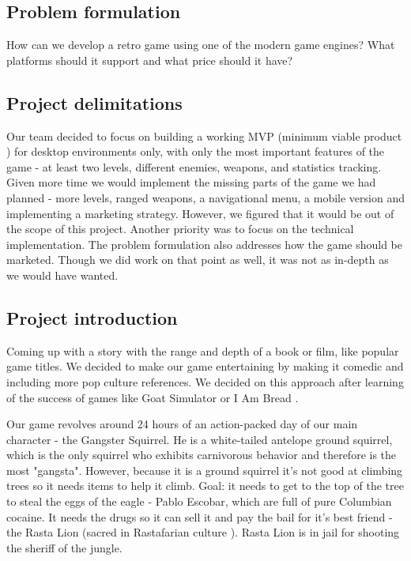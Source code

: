 \documentclass[12p]{article}
\begin{document}
\subsection{Problem formulation} \label{ProblemFormulation}

How can we develop a retro game using one of the modern game engines? What platforms should it support and what price should it have?

\subsection{Project delimitations} \label{ProjectDelimitations}

Our team decided to focus on building a working MVP (minimum viable product \cite{MVP}) for desktop environments only, with only the most important features of the game - at least two levels, different enemies, weapons, and statistics tracking. Given more time we would implement the missing parts of the game we had planned - more levels, ranged weapons, a navigational menu, a mobile version and implementing a marketing strategy. However, we figured that it would be out of the scope of this project.
Another priority was to focus on the technical implementation. The problem formulation also addresses how the game should be marketed. Though we did work on that point as well, it was not as in-depth as we would have wanted. 

\subsection{Project introduction} \label{ProjectIntroduction}

Coming up with a story with the range and depth of a book or film, like popular game titles. We decided to make our game entertaining by making it comedic and including more pop culture references. We decided on this approach after learning of the success of games like Goat Simulator \cite{GoatSimulator} or I Am Bread \cite{IAmBread}.

Our game revolves around 24 hours of an action-packed day of our main character - the Gangster Squirrel. He is a white-tailed antelope ground squirrel, which is the only squirrel who exhibits carnivorous behavior \cite{CarnivorousSquirells} and therefore is the most "gangsta". However, because it is a ground squirrel it’s not good at climbing trees so it needs items to help it climb.
Goal: it needs to get to the top of the tree to steal the eggs of the eagle - Pablo Escobar, which are full of pure Columbian cocaine. It needs the drugs so it can sell it and pay the bail for it’s best friend - the Rasta Lion (sacred in Rastafarian culture \cite{RastaLion}). Rasta Lion is in jail for shooting the sheriff \cite{Sheriff} of the jungle.
\end{document}
